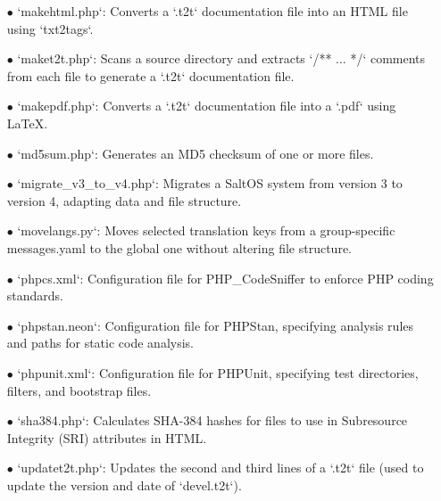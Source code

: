 \documentclass[a4paper]{article}
\begin{document}
\begin{itemize}
\item[\color{myblue}$\bullet$] `makehtml.php`: Converts a `.t2t` documentation file into an HTML file using `txt2tags`.
\item[\color{myblue}$\bullet$] `maket2t.php`: Scans a source directory and extracts `/** ... */` comments from each file to generate a `.t2t` documentation file.
\item[\color{myblue}$\bullet$] `makepdf.php`: Converts a `.t2t` documentation file into a `.pdf` using LaTeX.
\item[\color{myblue}$\bullet$] `md5sum.php`: Generates an MD5 checksum of one or more files.
\item[\color{myblue}$\bullet$] `migrate\_v3\_to\_v4.php`: Migrates a SaltOS system from version 3 to version 4, adapting data and file structure.
\item[\color{myblue}$\bullet$] `movelangs.py`: Moves selected translation keys from a group-specific messages.yaml to the global one without altering file structure.
\item[\color{myblue}$\bullet$] `phpcs.xml`: Configuration file for PHP\_CodeSniffer to enforce PHP coding standards.
\item[\color{myblue}$\bullet$] `phpstan.neon`: Configuration file for PHPStan, specifying analysis rules and paths for static code analysis.
\item[\color{myblue}$\bullet$] `phpunit.xml`: Configuration file for PHPUnit, specifying test directories, filters, and bootstrap files.
\item[\color{myblue}$\bullet$] `sha384.php`: Calculates SHA-384 hashes for files to use in Subresource Integrity (SRI) attributes in HTML.
\item[\color{myblue}$\bullet$] `updatet2t.php`: Updates the second and third lines of a `.t2t` file (used to update the version and date of `devel.t2t`).

\end{itemize}

\end{document}
